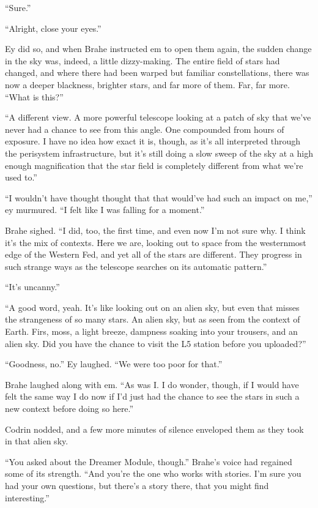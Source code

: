 ``Sure.''

``Alright, close your eyes.''

Ey did so, and when Brahe instructed em to open them again, the sudden change in the sky was, indeed, a little dizzy-making. The entire field of stars had changed, and where there had been warped but familiar constellations, there was now a deeper blackness, brighter stars, and far more of them. Far, far more. ``What is this?''

``A different view. A more powerful telescope looking at a patch of sky that we've never had a chance to see from this angle. One compounded from hours of exposure. I have no idea how exact it is, though, as it's all interpreted through the perisystem infrastructure, but it's still doing a slow sweep of the sky at a high enough magnification that the star field is completely different from what we're used to.''

``I wouldn't have thought thought that that would've had such an impact on me,'' ey murmured. ``I felt like I was falling for a moment.''

Brahe sighed. ``I did, too, the first time, and even now I'm not sure why. I think it's the mix of contexts. Here we are, looking out to space from the westernmost edge of the Western Fed, and yet all of the stars are different. They progress in such strange ways as the telescope searches on its automatic pattern.''

``It's uncanny.''

``A good word, yeah. It's like looking out on an alien sky, but even that misses the strangeness of so many stars. An alien sky, but as seen from the context of Earth. Firs, moss, a light breeze, dampness soaking into your trousers, and an alien sky. Did you have the chance to visit the L5 station before you uploaded?''

``Goodness, no.'' Ey laughed. ``We were too poor for that.''

Brahe laughed along with em. ``As was I. I do wonder, though, if I would have felt the same way I do now if I'd just had the chance to see the stars in such a new context before doing so here.''

Codrin nodded, and a few more minutes of silence enveloped them as they took in that alien sky.

``You asked about the Dreamer Module, though.'' Brahe's voice had regained some of its strength. ``And you're the one who works with stories. I'm sure you had your own questions, but there's a story there, that you might find interesting.''

